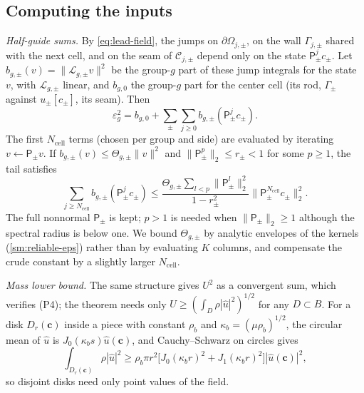 \subsection{Computing the inputs}\label{sec:computation}
\emph{Half-guide sums.} By \eqref{eq:lead-field}, the jumps on
$\partial\Omega_{j,\pm}$, on the wall $\Gamma_{j,\pm}$ shared with the next cell,
and on the seam of $\mathcal C_{j,\pm}$ depend only on the state
$\mathsf P_\pm^jc_\pm$. Let $b_{g,\pm}(v)=\|\mathcal L_{g,\pm}v\|^2$ be the
group-$g$ part of these jump integrals for the state $v$, with $\mathcal L_{g,\pm}$
linear, and $b_{g,0}$ the group-$g$ part for the center cell (its rod, $\Gamma_\pm$
against $u_\pm[c_\pm]$, its seam). Then
\begin{equation}\label{eq:lead-sum}
  \varepsilon_g^2=b_{g,0}+\sum_\pm\sum_{j\ge0}b_{g,\pm}(\mathsf P_\pm^jc_\pm).
\end{equation}
The first $N_{\mathrm{cell}}$ terms (chosen per group and side) are evaluated
by iterating $v\leftarrow\mathsf P_\pm v$. If $b_{g,\pm}(v)\le\Theta_{g,\pm}\|v\|^2$ and
$\|\mathsf P_\pm^p\|_2\le r_\pm<1$ for some $p\ge1$, the tail satisfies
\begin{equation}\label{eq:tail}
  \sum_{j\ge N_{\mathrm{cell}}}b_{g,\pm}(\mathsf P_\pm^jc_\pm)
  \le\frac{\Theta_{g,\pm}\sum_{l<p}\|\mathsf P_\pm^l\|_2^2}{1-r_\pm^2}
  \bigl\|\mathsf P_\pm^{N_{\mathrm{cell}}}c_\pm\bigr\|_2^2 .
\end{equation}
The full nonnormal $\mathsf P_\pm$ is kept; $p>1$ is needed when
$\|\mathsf P_\pm\|_2\ge1$ although the spectral radius is below one. We bound
$\Theta_{g,\pm}$ by analytic envelopes of the kernels (\cref{sm:reliable-eps})
rather than by evaluating $K$ columns, and compensate the crude constant by a
slightly larger $N_{\mathrm{cell}}$.

\emph{Mass lower bound.} The same structure gives $U^2$ as a convergent sum, which
verifies (P4); the theorem needs only $U\ge(\int_D\rho|\widehat u|^2)^{1/2}$ for
any $D\subset B$. For a disk $D_r(\mathbf c)$ inside a piece with constant
$\rho_b$ and $\kappa_b=(\mu\rho_b)^{1/2}$, the circular mean of $\widehat u$ is
$J_0(\kappa_bs)\widehat u(\mathbf c)$, and Cauchy--Schwarz on circles gives
\begin{equation}\label{eq:disk}
  \int_{D_r(\mathbf c)}\rho|\widehat u|^2\ge\rho_b\pi r^2
  \bigl[J_0(\kappa_br)^2+J_1(\kappa_br)^2\bigr]|\widehat u(\mathbf c)|^2 ,
\end{equation}
so disjoint disks need only point values of the field.

